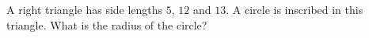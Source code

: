 A right triangle has side lengths $5$, $12$ and $13$. A circle is inscribed in this triangle. What is the radius of the circle?
